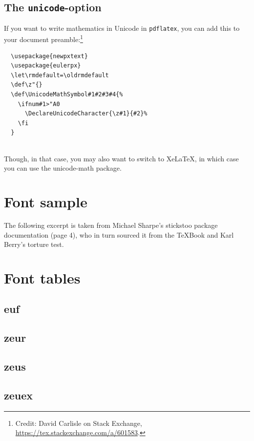 \documentclass[11pt,a4paper,english]{article}
\newcommand*\pkg[1]{{\sf #1}}
\begin{document}
\subsection{The {\tt unicode}-option}
If you want to write mathematics in Unicode in {\tt pdflatex}, you can add this to your document preamble:\footnote{Credit: David Carlisle on Stack Exchange, \url{https://tex.stackexchange.com/a/601583}.}
\begin{verbatim}
  \usepackage{newpxtext}
  \usepackage{eulerpx}
  \let\rmdefault=\oldrmdefault
  \def\z"{}
  \def\UnicodeMathSymbol#1#2#3#4{%
    \ifnum#1>"A0
      \DeclareUnicodeCharacter{\z#1}{#2}%
    \fi
  }
  
\end{verbatim}
Though, in that case, you may also want to switch to Xe\LaTeX, in which case you can use the \pkg{unicode-math} package.

\pagebreak
\appendix
\section{Font sample}\label{sec:sample}
The following excerpt is taken from Michael Sharpe's \pkg{stickstoo} package documentation (page 4), who in turn sourced it from the \TeX Book and Karl Berry's torture test.

 

\newpage
\section{Font tables}\label{sec:tables}
\subsection{euf}

\newpage
\subsection{zeur}

\newpage
\subsection{zeus}

\newpage
\subsection{zeuex}
\end{document}
